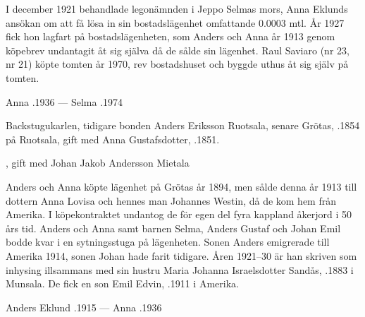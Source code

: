 I december 1921 behandlade legonämnden i Jeppo Selmas mors, Anna Eklunds ansökan om att få lösa in sin bostadslägenhet omfattande 0.0003 mtl. År 1927 fick hon lagfart på bostadslägenheten, som Anders och Anna år 1913 genom köpebrev undantagit  åt sig själva då de sålde sin lägenhet. Raul Saviaro (nr 23, nr 21) köpte tomten år 1970, rev bostadshuset och byggde uthus åt sig själv på tomten.

Anna .1936  ---  Selma .1974


Backstugukarlen, tidigare bonden Anders Eriksson Ruotsala, senare Grötas, .1854 på Ruotsala, gift med Anna Gustafsdotter, .1851.
\begin{jhchildren}
  \item {}
  \item {}
  \item {}
  \item {}
  \item {}, gift med Johan Jakob Andersson Mietala
  \item {}
  \item {}
\end{jhchildren}

Anders och Anna köpte lägenhet på Grötas år 1894, men sålde denna år 1913 till dottern Anna Lovisa och hennes man Johannes Westin, då de kom hem från Amerika. I köpekontraktet undantog de för egen del fyra kappland åkerjord i 50 års tid. Anders och Anna samt barnen Selma, Anders Gustaf och Johan Emil bodde kvar i en sytningsstuga på lägenheten. Sonen Anders emigrerade till Amerika 1914, sonen Johan hade farit tidigare. Åren 1921–30 är han skriven som inhysing illsammans med sin hustru Maria Johanna Israelsdotter Sandås, .1883 i Munsala. De fick en son Emil Edvin, .1911 i Amerika.

Anders Eklund .1915  ---  Anna .1936





